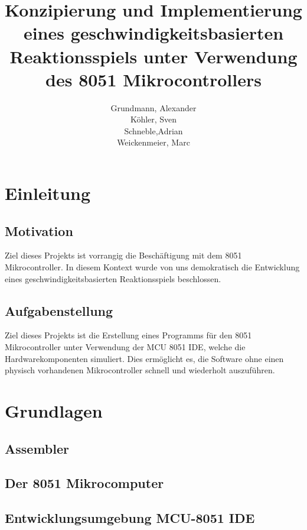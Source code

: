 \documentclass[11pt,ngerman]{report}
\title{Konzipierung und Implementierung eines geschwindigkeitsbasierten Reaktionsspiels unter Verwendung des 8051 Mikrocontrollers}
\author{Grundmann, Alexander\\Köhler, Sven\\Schneble,Adrian\\Weickenmeier, Marc}
\begin{document}
	
\maketitle

\tableofcontents


\chapter{Einleitung}

\section{Motivation}

Ziel dieses Projekts ist vorrangig die Beschäftigung mit dem 8051 Mikrocontroller.
In diesem Kontext wurde von uns demokratisch die Entwicklung eines geschwindigkeitsbasierten Reaktionsspiels beschlossen.

\section{Aufgabenstellung}

Ziel dieses Projekts ist die Erstellung eines Programms für den 8051 Mikrocontroller unter Verwendung der MCU 8051 IDE, welche die Hardwarekomponenten simuliert.
Dies ermöglicht es, die Software ohne einen physisch vorhandenen Mikrocontroller schnell und wiederholt auszuführen.



\chapter{Grundlagen}

\section{Assembler}



\section{Der 8051 Mikrocomputer}



\section{Entwicklungsumgebung MCU-8051 IDE}
\end{document}
